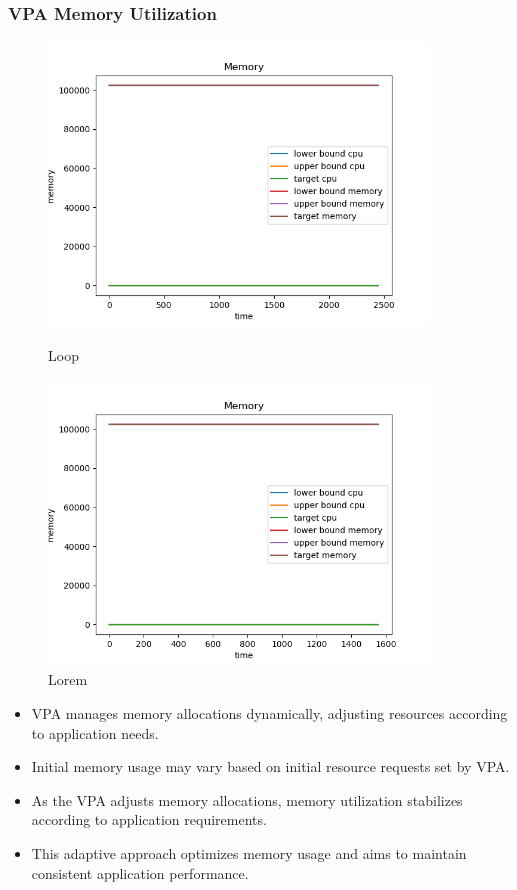 \subsubsection{VPA Memory Utilization}
\begin{figure}[h]
    \begin{minipage}[t]{0.5\textwidth}
        \centering
        \includegraphics[width=0.9\textwidth]{../sample_results/loop/vpa/mem-utilization-vpa.png}
        \caption{Loop}
    \end{minipage}
    \hfill
    \begin{minipage}[t]{0.5\textwidth}
        \centering
        \includegraphics[width=0.9\textwidth]{../sample_results/lorem/vpa/mem-utilization-vpa.png}
        \caption{Lorem}
    \end{minipage}
\end{figure}

\begin{itemize}
    \item VPA manages memory allocations dynamically, adjusting resources according to application needs.
    \item Initial memory usage may vary based on initial resource requests set by VPA.
    \item As the VPA adjusts memory allocations, memory utilization stabilizes according to application requirements.
    \item This adaptive approach optimizes memory usage and aims to maintain consistent application performance.
\end{itemize}


